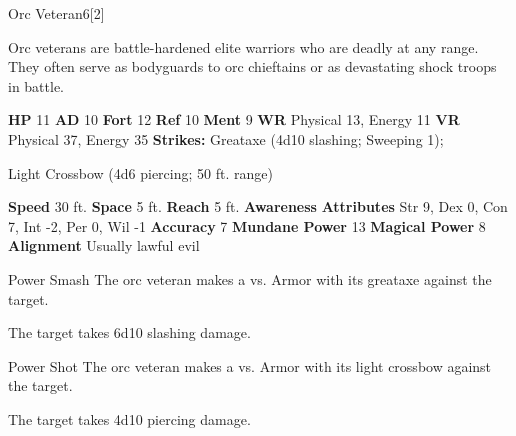   \begin{monsubsection}{Orc Veteran}{6}[2]
    \vspace{-1em}\vspace{-1em}
    \vspace{0em}

    
          Orc veterans are battle-hardened elite warriors who are deadly at any range.
          They often serve as bodyguards to orc chieftains or as devastating shock troops in battle.
        

    \begin{spellcontent}
      \begin{spelltargetinginfo}
        \pari \textbf{HP} 11 \monsep
          \textbf{AD} 10 \monsep
          \textbf{Fort} 12 \monsep
          \textbf{Ref} 10 \monsep
          \textbf{Ment} 9
        \pari \textbf{WR} Physical 13, Energy 11 \monsep
        \textbf{VR} Physical 37, Energy 35
        \pari \textbf{Strikes:}
            Greataxe  (4d10 slashing; Sweeping 1);
\par Light Crossbow  (4d6 piercing; 50 ft. range)
      \end{spelltargetinginfo}
    \end{spellcontent}
    \begin{monsterfooter}
      \pari \textbf{Speed} 30 ft. \monsep
        \textbf{Space} 5 ft. \monsep
        \textbf{Reach} 5 ft.
      \pari \textbf{Awareness} 
      \pari \textbf{Attributes}
        Str 9, Dex 0,
        Con 7, Int -2,
        Per 0, Wil -1
      \pari \textbf{Accuracy} 7 \monsep
        \textbf{Mundane Power} 13 \monsep
      \textbf{Magical Power} 8
      \pari \textbf{Alignment} Usually lawful evil
    \end{monsterfooter}
  \end{monsubsection}
  \begin{freeability}{Power Smash}
       The orc veteran makes a 
         vs. Armor
        with its greataxe against the target.
    
    \hit The target takes 6d10 slashing damage.
    \end{freeability}
  

    \begin{freeability}{Power Shot}
       The orc veteran makes a 
         vs. Armor
        with its light crossbow against the target.
    
    \hit The target takes 4d10 piercing damage.
    \end{freeability}
  

